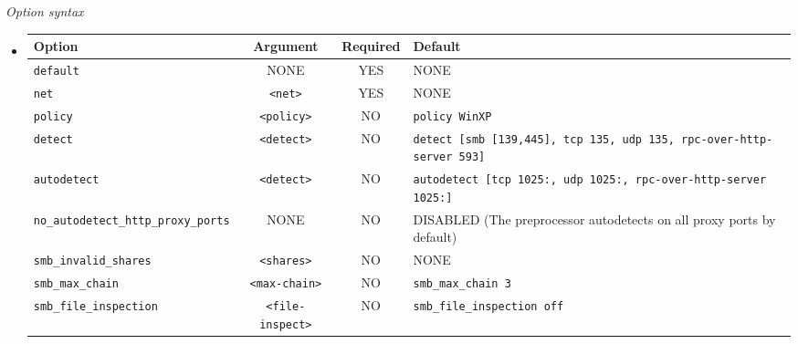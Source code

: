 \documentclass[english]{report}
\begin{document}
\textit{Option syntax}
\begin{itemize}
\item[]
\begin{tabular}{|l|c|c|p{6cm}|}

\hline
Option & Argument & Required & Default\\
\hline

\hline
\texttt{default} & NONE              & YES & NONE\\

\hline
\texttt{net}     & \texttt{<net>}    & YES & NONE\\

\hline
\texttt{policy}  & \texttt{<policy>} &  NO & \texttt{policy WinXP}\\

\hline
\texttt{detect}  & \texttt{<detect>} &  NO & \texttt{detect [smb [139,445], tcp
135, udp 135, rpc-over-http-server 593]}\\

\hline
\texttt{autodetect} & \texttt{<detect>} & NO & \texttt{autodetect [tcp
1025:, udp 1025:, rpc-over-http-server 1025:]}\\

\hline
\texttt{no\_autodetect\_http\_proxy\_ports} & NONE & NO & DISABLED (The
preprocessor autodetects on all proxy ports by default)\\

\hline
\texttt{smb\_invalid\_shares} & \texttt{<shares>} & NO & NONE\\

\hline
\texttt{smb\_max\_chain} & \texttt{<max-chain>} & NO & \texttt{smb\_max\_chain 3}\\

\hline
\texttt{smb\_file\_inspection} & \texttt{<file-inspect>} & NO & \texttt{smb\_file\_inspection off}\\

\hline
\end{tabular}
\end{itemize}
\end{document}
